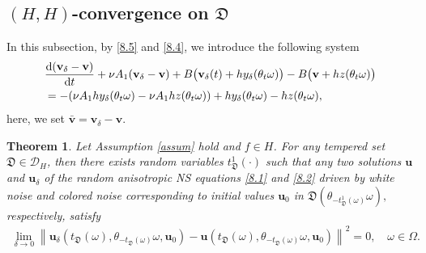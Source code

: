 \documentclass{elsarticle}
\newtheorem{theorem}{Theorem}[section]
\theoremstyle{definition}
\numberwithin{equation}{section}
\newcommand{\D}{\mathcal{D}}
\renewcommand{\d}{{\rm{d}}}
\begin{document}
\subsection{$(H,H)$-convergence on $\mathfrak D$}
In this subsection, by \eqref{8.5} and \eqref{8.4}, we introduce the following system
\begin{align}\label{8.6}
&
\frac{\d (\textbf{v}_\delta-\textbf{v})}{\d t}+ \nu A_1(\textbf{v}_\delta-\textbf{v})+B\big( \textbf{v}_\delta(t)+hy_\delta(\theta_t\omega)\big)-B\big( \textbf{v}+hz(\theta_t\omega)\big)\nonumber\\
&=-  (\nu A_1hy_\delta(\theta_t\omega)-\nu A_1hz(\theta_t\omega))+hy_\delta (\theta_t\omega)-hz(\theta_t\omega),
\end{align}
here, we set $\bar{\textbf{v}}=\textbf{v}_\delta-\textbf{v}$.
\begin{theorem}\label{lemma8.1}
 Let Assumption \ref{assum} hold and $f\in H$.
 For  any tempered set $\mathfrak D\in \D_H $, then there exists random variables $t_{\mathfrak D}^1(\cdot) $ such that any
 two solutions $\textbf{u}$ and $\textbf{u}_\delta$ of the random anisotropic  NS equations \eqref{8.1} and \eqref{8.2} driven by  white noise  and colored noise corresponding to initial values $\textbf{u}_{0}$  in $ \mathfrak D( \theta_{-t_{\mathfrak D}^1(\omega)}\omega),$   respectively,  satisfy
\begin{align*}
\lim\limits_{\delta\rightarrow0}\left \| \textbf{u}_\delta \! \left ( t_{\mathfrak D} (\omega) ,\theta_{-t_{\mathfrak D}(\omega)}\omega,  \textbf{u}_{0}\right)
 - \textbf{u} \! \left ( t_{\mathfrak D} (\omega) ,\theta_{-t_{\mathfrak D}(\omega)}\omega, \textbf{u}_{0}\right) \right \|^2  =0,\quad \omega \in \Omega.
\end{align*}

\end{theorem}
\end{document}
